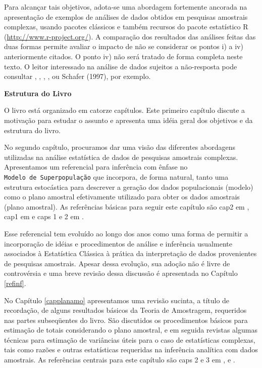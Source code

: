 \documentclass[]{book}
\numberwithin{example}{chapter}
\numberwithin{remark}{chapter}
\numberwithin{definition}{chapter}
\begin{document}
Para alcançar tais objetivos, adota-se uma abordagem fortemente ancorada
na apresentação de exemplos de análises de dados obtidos em pesquisas
amostrais complexas, usando pacotes clássicos e também recursos do
pacote estatístico R (\url{http://www.r-project.org/}). A comparação dos
resultados das análises feitas das duas formas permite avaliar o impacto
de não se considerar os pontos i) a iv) anteriormente citados. O ponto
iv) não será tratado de forma completa neste texto. O leitor interessado
na análise de dados sujeitos a não-resposta pode consultar
\citep{kalton83a}, \citep{LR2002}, \citep{Rubin87}, \citep{SSW92}, ou
Schafer (1997), por exemplo.

\textbf{Estrutura do Livro}

O livro está organizado em catorze capítulos. Este primeiro capítulo
discute a motivação para estudar o assunto e apresenta uma idéia geral
dos objetivos e da estrutura do livro.

No segundo capítulo, procuramos dar uma visão das diferentes abordagens
utilizadas na análise estatística de dados de pesquisas amostrais
complexas. Apresentamos um referencial para inferência com ênfase no
\texttt{Modelo\ de\ Superpopulação} que incorpora, de forma natural,
tanto uma estrutura estocástica para descrever a geração dos dados
populacionais (modelo) como o plano amostral efetivamente utilizado para
obter os dados amostrais (plano amostral). As referências básicas para
seguir este capítulo são cap2 em \citep{Silva}, cap1 em \citep{SHS89} e
caps 1 e 2 em \citep{CHSK2003}.

Esse referencial tem evoluído ao longo dos anos como uma forma de
permitir a incorporação de idéias e procedimentos de análise e
inferência usualmente associados à Estatística Clássica à prática da
interpretação de dados provenientes de pesquisas amostrais. Apesar dessa
evolução, sua adoção não é livre de controvérsia e uma breve revisão
dessa discussão é apresentada no Capítulo \ref{refinf}.

No Capítulo \ref{capplanamo} apresentamos uma revisão sucinta, a título
de recordação, de alguns resultados básicos da Teoria de Amostragem,
requeridos nas partes subseqüentes do livro. São discutidos os
procedimentos básicos para estimação de totais considerando o plano
amostral, e em seguida revistas algumas técnicas para estimação de
variâncias úteis para o caso de estatísticas complexas, tais como razões
e outras estatísticas requeridas na inferência analítica com dados
amostrais. As referências centrais para este capítulo são caps 2 e 3 em
\citep{SSW92}, \citep{W85} e \citep{cochran}.
\end{document}
